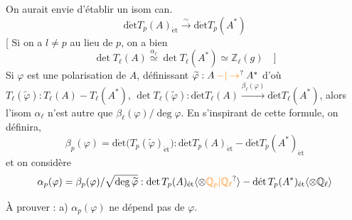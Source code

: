 On aurait envie d'établir un isom can.
\[
\operatorname{d\acute et}T_p(A)_{\mathrm{\acute et}}\xrightarrow{\sim}\operatorname{d\acute et}T_p(A^*)
\]
[ Si on a $l\ne p$ au lieu de $p$, on a bien
\[
\det T_{\ell}(A)\overset{\alpha_\ell}{\simeq}\det T_\ell(A^*)\simeq\mathbb Z_\ell(g)\quad]
\]
 Si $\varphi$ est une
polarisation de $A$,
définissant $\widetilde\varphi:A\mathbin{\unsure{-|\to}}A^*$ d'où $T_\ell(\widetilde\varphi):T_\ell(A)\mathbin{-}T_\ell(A^*)$,
$\operatorname{det}T_\ell(\widetilde\varphi):\operatorname{d\acute et}T_\ell(A)\xrightarrow{\beta_\ell(\varphi)}\operatorname{d\acute et}T_\ell(A^*)$,
alors l'isom $\alpha_\ell$ n'est autre que $\beta_\ell(\varphi)/\deg\varphi$. En s'inspirant de
cette formule, on définira,
\[
\beta_p(\varphi)=\operatorname{d\acute et}\bigl(T_p(\widetilde\varphi)_{\mathrm{\acute et}}\bigr):
\operatorname{d\acute et}T_p(A)_{\mathrm{\acute et}}\mathbin{-}\operatorname{d\acute et}T_p(A^*)_{\mathrm{\acute et}}
\]
et on considère
\[
\alpha_p(\varphi)=\beta_p(\varphi)/\sqrt{\deg\widetilde\varphi}:
\det T_p(A)_{\mathrm{\acute et}}\inserted{\otimes\unsure{\mathbb Q_p|\mathbb Q_\ell}}\mathbin{-}
\operatorname{d\acute et}T_p(A^*)_{\mathrm{\acute et}}\inserted{\otimes\mathbb Q_\ell}
\]

À prouver : a) $\alpha_p(\varphi)$ ne dépend pas de $\varphi$.


